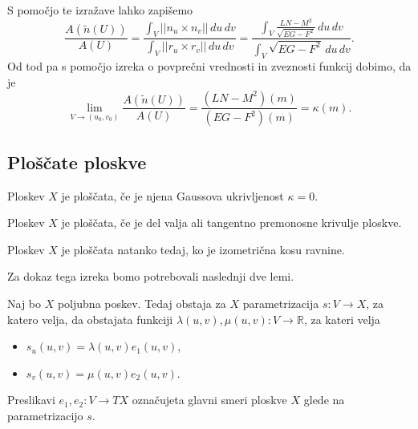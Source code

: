 S pomočjo te izražave lahko zapišemo \begin{equation*}
    \frac{A(\tilde{n}(U))}{A(U)} = \frac{\int_{V} \lvert\lvert n_u \times  n_v \rvert\rvert   \, du \, dv}{\int_{V} \lvert\lvert r_u \times  r_v \rvert\rvert   \, du \, dv} 
    = \frac{\int_{V} \frac{LN - M^2}{\sqrt{EG - F^2} }   \, du \, dv}{\int_{V} \sqrt{EG - F^2} \, du \, dv }.
    \end{equation*}  
Od tod pa s pomočjo izreka o povprečni vrednosti in zveznosti funkcij dobimo, da je \begin{equation*}
\lim_{V \to (u_0, v_0)} \frac{A(\tilde{n}(U))}{A(U)} = \frac{(LN - M^2)(m)}{(EG - F^2)(m)} = \kappa(m).
\end{equation*}  


\subsection{Ploščate ploskve}

\begin{definicija}
\label{def_ploscate_ploskve}
Ploskev $X$ je ploščata, če je njena Gaussova ukrivljenost $\kappa = 0$. 
\end{definicija}

\begin{izrek}
\label{izr_plsokev_je_ploscata_ce_je_del_valja_ali_tangentnopremosnosne_ploskve}
Ploskev $X$ je ploščata, če je del valja ali tangentno premonosne krivulje ploskve.
\end{izrek}

\begin{posledica}
\label{psl_plsokev_je_ploscata_iff_izometricna_kosu_ravnine}
Ploskev $X$ je ploščata natanko tedaj, ko je izometrična kosu ravnine.
\end{posledica}

Za dokaz tega izreka bomo potrebovali naslednji dve lemi.


\begin{lema}
\label{lem_obstoj_funkcij}
Naj bo $X$ poljubna poskev. Tedaj obstaja za $X$ parametrizacija $s : V \to  X$, za katero velja, da obstajata funkciji $\lambda(u,v), \mu(u,v) : V \to  \mathbb{R}$, za kateri velja
\begin{itemize}
  \item $s_u(u,v) = \lambda(u,v)e_1(u,v)$,
  \item $s_v(u,v) = \mu(u,v)e_2(u,v)$.
\end{itemize}
Preslikavi $e_1, e_2: V \to  TX$ označujeta glavni smeri ploskve $X$ glede na parametrizacijo $s$.
\end{lema}

